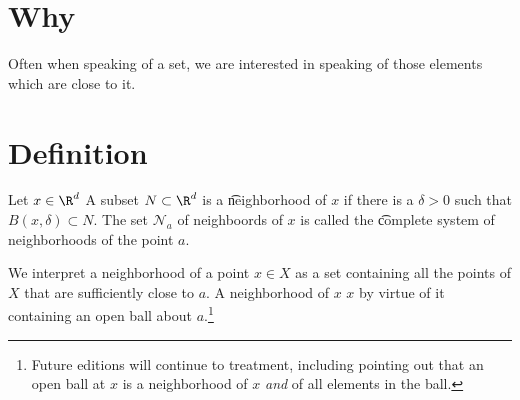 

\section*{Why}

Often when speaking of a set, we are interested in speaking of those elements which are close to it.

\section*{Definition}

Let $x \in \R ^d$
A subset $N \subset \R ^d$ is a \t{neighborhood of $x$} if there is a $\delta  > 0$ such that $B(x, \delta ) \subset N$.
The set $\mathcal{N} _a$ of neighboords of $x$ is called the \t{complete system of neighborhoods} of the point $a$.

We interpret a neighborhood of a point $x \in X$ as a set containing all the points of $X$ that are sufficiently close to $a$.
A neighborhood of $x$  $x$ by virtue of it containing an open ball about $a$.\footnote{Future editions will continue to treatment, including pointing out that an open ball at $x$ is a neighborhood of $x$ \textit{and} of all elements in the ball.}

\blankpage